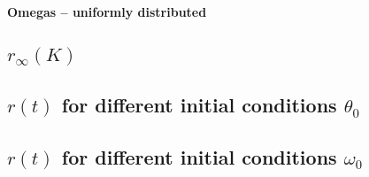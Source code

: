 \documentclass[10pt,a4paper]{article}
\begin{document}
{\large\textbf{Omegas -- uniformly distributed}}
\subsection{$r_{\infty}(K)$}















\subsection{$r(t)$ for different initial conditions $\theta_0$}






















\subsection{$r(t)$ for different initial conditions $\omega_0$}
\end{document}
